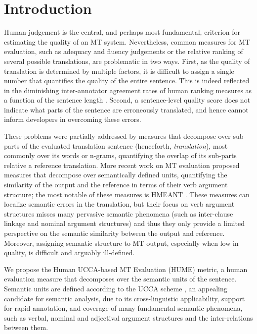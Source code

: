 \documentclass[11pt]{article}
\begin{document}
\section{Introduction}\label{sec:intro}

Human judgement is the central, and perhaps most fundamental, criterion for
estimating the quality of an MT system.
Nevertheless, common measures for MT evaluation, such as adequacy and fluency judgements
or the relative ranking of several possible translations, are problematic in two ways.
First, as the quality of translation is determined by multiple factors, it is difficult
to assign a single number that quantifies the quality of the entire sentence. This
is indeed reflected in the diminishing inter-annotator agreement rates of human ranking measures
as a function of the sentence length \cite{Bojar:2011}.
Second, a sentence-level quality score does not indicate what parts of the sentence
are erroneously translated, and hence cannot inform developers in overcoming these errors.

These problems were partially addressed by measures that decompose over sub-parts of the evaluated
translation sentence (henceforth, {\it translation}),
most commonly over its words or n-grams,
quantifying the overlap of its sub-parts relative a reference translation.
More recent work on MT evaluation proposed measures
that decompose over semantically defined units,
quantifying the similarity of the output and the reference in terms of
their verb argument structure; the most notable of these measures is
HMEANT \cite{lo2011structured}.
These measures can localize semantic errors in the translation, but
their focus on verb argument structures misses many pervasive semantic phenomena
(such as inter-clause linkage and nominal argument structures) and thus they only provide
a limited perspective on the semantic similarity between the output and reference.
Moreover, assigning semantic structure to MT output, especially when low in quality,
is difficult and arguably ill-defined.

We propose the Human UCCA-based MT Evaluation (HUME) metric,
a human evaluation measure that decomposes over the semantic units of the sentence.
Semantic units are defined according to the 
UCCA scheme \cite{abend2013universal}, an appealing candidate for semantic analysis,
due to its cross-linguistic applicability, support for rapid annotation, and coverage
of many fundamental semantic phenomena, such as verbal, nominal and adjectival
argument structures and the inter-relations between them.
\end{document}
